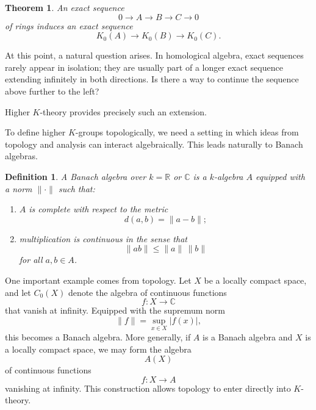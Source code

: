 \documentclass[12pt,reqno]{amsart}
\theoremstyle{plain}
\newtheorem{defn}[thm]{Definition}
\numberwithin{equation}{section}
\newtheorem{theorem}{Theorem}[section]
\begin{document}
\begin{theorem}\label{thm: exactness of K0}
An exact sequence
\[
0\longrightarrow A\longrightarrow B\longrightarrow C\longrightarrow 0
\]
of rings induces an exact sequence
\[
K_0(A)\longrightarrow K_0(B)\longrightarrow K_0(C).
\]
\end{theorem}

At this point, a natural question arises. In homological algebra, exact sequences rarely appear in isolation; they are usually part of a longer exact sequence extending infinitely in both directions. Is there a way to continue the sequence above further to the left?

Higher $K$-theory provides precisely such an extension.


To define higher $K$-groups topologically, we need a setting in which ideas from topology and analysis can interact algebraically. This leads naturally to Banach algebras.

\begin{defn}
A \emph{Banach algebra} over $k=\mathbb R$ or $\mathbb C$ is a $k$-algebra $A$ equipped with a norm $\|\cdot\|$ such that:
\begin{enumerate}[label=$(\arabic*)$]
    \item $A$ is complete with respect to the metric
    \[
    d(a,b)=\|a-b\|;
    \]
    \item multiplication is continuous in the sense that
    \[
    \|ab\|\le \|a\|\,\|b\|
    \]
    for all $a,b\in A$.
\end{enumerate}
\end{defn}

One important example comes from topology. Let $X$ be a locally compact space, and let $C_0(X)$ denote the algebra of continuous functions
\[
f:X\to \mathbb C
\]
that vanish at infinity. Equipped with the supremum norm
\[
\|f\|=\sup_{x\in X}|f(x)|,
\]
this becomes a Banach algebra.
More generally, if $A$ is a Banach algebra and $X$ is a locally compact space, we may form the algebra
\[
A(X)
\]
of continuous functions
\[
f:X\to A
\]
vanishing at infinity. This construction allows topology to enter directly into $K$-theory.

\end{document}
